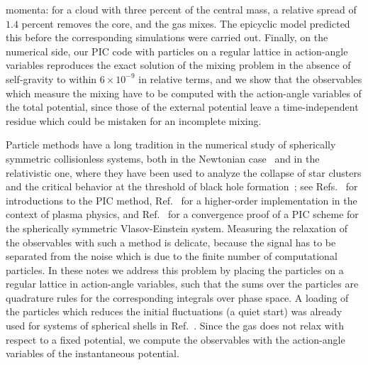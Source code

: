 momenta: for a cloud with three percent of the central mass, a relative spread of $1.4$ percent removes the core, and the gas mixes. The epicyclic model predicted this before the corresponding simulations were carried out. Finally, on the numerical side, our PIC code with particles on a regular lattice in action-angle variables reproduces the exact solution of the mixing problem in the absence of self-gravity to within $6\times 10^{-9}$ in relative terms, and we show that the observables which measure the mixing have to be computed with the action-angle variables of the total potential, since those of the external potential leave a time-independent residue which could be mistaken for an incomplete mixing.

Particle methods have a long tradition in the numerical study of spherically symmetric collisionless systems, both in the Newtonian case~\cite{tRgR18,cS24} and in the relativistic one, where they have been used to analyze the collapse of star clusters and the critical behavior at the threshold of black hole formation~\cite{sStT85,gRaRjS98,Olabarrieta:2000bn,Olabarrieta:2001wy,hAgR06}; see Refs.~\cite{BirdsallLangdon-Book,HockneyEastwood-Book,lapenta2015kinetic} for introductions to the PIC method, Ref.~\cite{Shalaby:2017yok} for a higher-order implementation in the context of plasma physics, and Ref.~\cite{gRtR03} for a convergence proof of a PIC scheme for the spherically symmetric Vlasov-Einstein system. Measuring the relaxation of the observables with such a method is delicate, because the signal has to be separated from the noise which is due to the finite number of computational particles. In these notes we address this problem by placing the particles on a regular lattice in action-angle variables, such that the sums over the particles are quadrature rules for the corresponding integrals over phase space. A loading of the particles which reduces the initial fluctuations (a quiet start) was already used for systems of spherical shells in Ref.~\cite{mH73}. Since the gas does not relax with respect to a fixed potential, we compute the observables with the action-angle variables of the instantaneous potential.

